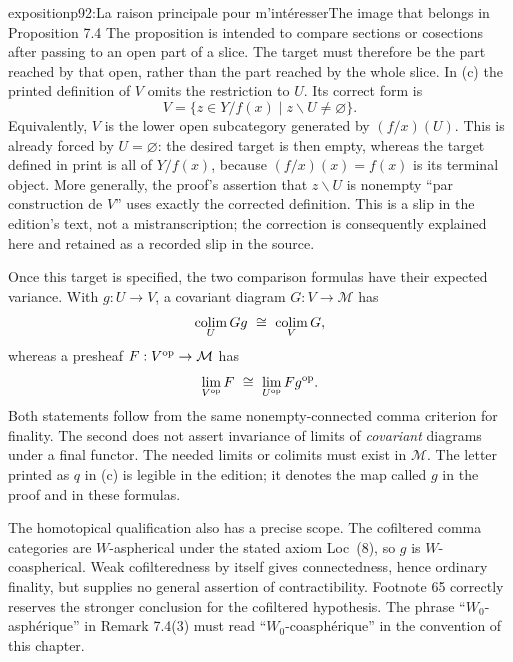 \begin{dcomment}{exposition}{p92:La raison principale pour m'intéresser}{The image that belongs in Proposition 7.4}
The proposition is intended to compare sections or cosections after passing to an open part of a slice. The target must therefore be the part reached by that open, rather than the part reached by the whole slice. In (c) the printed definition of $V$ omits the restriction to $U$. Its correct form is
\[
 V=\{z\in Y/f(x)\mid z\backslash U\ne\varnothing\}.
\]
Equivalently, $V$ is the lower open subcategory generated by $(f/x)(U)$. This is already forced by $U=\varnothing$: the desired target is then empty, whereas the target defined in print is all of $Y/f(x)$, because $(f/x)(x)=f(x)$ is its terminal object. More generally, the proof's assertion that $z\backslash U$ is nonempty ``par construction de $V$'' uses exactly the corrected definition. This is a slip in the edition's text, not a mistranscription; the correction is consequently explained here and retained as a recorded slip in the source.

Once this target is specified, the two comparison formulas have their expected variance. With $g:U\to V$, a covariant diagram $G:V\to\mathcal M$ has
\[
\mathop{\rm colim}_{U}Gg\ \cong\ \mathop{\rm colim}_{V}G,
\]
whereas a presheaf $F:V^{\rm op}\to\mathcal M$ has
\[
\mathop{\rm lim}_{V^{\rm op}}F\ \cong\
\mathop{\rm lim}_{U^{\rm op}}Fg^{\rm op}.
\]
Both statements follow from the same nonempty-connected comma criterion for finality. The second does not assert invariance of limits of \emph{covariant} diagrams under a final functor. The needed limits or colimits must exist in $\mathcal M$. The letter printed as $q$ in (c) is legible in the edition; it denotes the map called $g$ in the proof and in these formulas.

The homotopical qualification also has a precise scope. The cofiltered comma categories are $W$-aspherical under the stated axiom Loc~(8), so $g$ is $W$-coaspherical. Weak cofilteredness by itself gives connectedness, hence ordinary finality, but supplies no general assertion of contractibility. Footnote 65 correctly reserves the stronger conclusion for the cofiltered hypothesis. The phrase ``$W_0$-asph\'erique'' in Remark 7.4(3) must read ``$W_0$-coasph\'erique'' in the convention of this chapter.
\end{dcomment}

